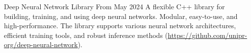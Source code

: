 
\begin{cventries}
	\cventrytool
		{Deep Neural Network Library}
		{From May 2024}
		{
			A flexible C++ library for building, training, and using deep neural networks. Modular, easy-to-use, and high-performance. The library supports various neural network architectures, efficient training tools, and robust inference methods (\url{https://github.com/unipr-org/deep-neural-network}).
		}
\end{cventries}
